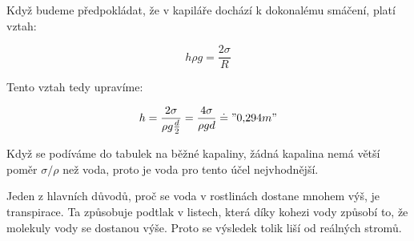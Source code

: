 \documentclass{fkssolpub}
\author{Ondřej Sedláček}
\begin{document}
Když budeme předpokládat, že v kapiláře dochází k dokonalému smáčení, platí vztah:

\[
	h \rho g = \frac{2\sigma}{R}
\]

Tento vztah tedy upravíme:

\[
	h = \frac{2 \sigma}{\rho g \frac{d}{2}} = \frac{4 \sigma}{\rho g d} \doteq "0{,}294 m"
\]

Když se podíváme do tabulek na běžné kapaliny, žádná kapalina nemá větší poměr $\sigma/\rho$ než voda, proto je voda pro tento účel nejvhodnější.

Jeden z hlavních důvodů, proč se voda v rostlinách dostane mnohem výš, je transpirace. Ta způsobuje podtlak v listech, která díky kohezi vody způsobí to, že molekuly vody se dostanou výše. Proto se výsledek tolik liší od reálných stromů.
\end{document}
